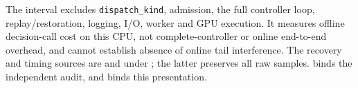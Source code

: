 The interval excludes \texttt{dispatch\_kind}, admission, the full controller
loop, replay/restoration, logging, I/O, worker and GPU execution. It measures
offline decision-call cost on this CPU, not complete-controller or online
end-to-end overhead, and cannot establish absence of online tail interference.
The recovery and timing sources are  and
 under
; the latter preserves all raw samples.
 binds the independent audit, and
 binds this presentation.
